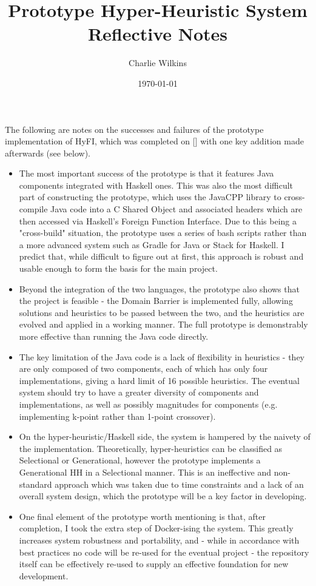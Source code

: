 \documentclass[11pt]{article}
\title{Prototype Hyper-Heuristic System Reflective Notes}
\author{Charlie Wilkins}
\date{\today}
\begin{document}
	\maketitle
	
	The following are notes on the successes and failures of the prototype implementation of HyFI, which was completed on [] with one key addition made afterwards (see below).

	\begin{itemize}
		\item The most important success of the prototype is that it features Java components integrated with Haskell ones. This was also the most difficult part of constructing the prototype, which uses the JavaCPP library to cross-compile Java code into a C Shared Object and associated headers which are then accessed via Haskell's Foreign Function Interface. Due to this being a "cross-build" situation, the prototype uses a series of bash scripts rather than a more advanced system such as Gradle for Java or Stack for Haskell. I predict that, while difficult to figure out at first, this approach is robust and usable enough to form the basis for the main project.
		\item Beyond the integration of the two languages, the prototype also shows that the project is feasible - the Domain Barrier is implemented fully, allowing solutions and heuristics to be passed between the two, and the heuristics are evolved and applied in a working manner. The full prototype is demonstrably more effective than running the Java code directly.
		\item The key limitation of the Java code is a lack of flexibility in heuristics - they are only composed of two components, each of which has only four implementations, giving a hard limit of 16 possible heuristics. The eventual system should try to have a greater diversity of components and implementations, as well as possibly magnitudes for components (e.g. implementing k-point rather than 1-point crossover).
		\item On the hyper-heuristic/Haskell side, the system is hampered by the naivety of the implementation. Theoretically, hyper-heuristics can be classified as Selectional or Generational, however the prototype implements a Generational HH in a Selectional manner. This is an ineffective and non-standard approach which was taken due to time constraints and a lack of an overall system design, which the prototype will be a key factor in developing.
		\item One final element of the prototype worth mentioning is that, after completion, I took the extra step of Docker-ising the system. This greatly increases system robustness and portability, and - while in accordance with best practices no code will be re-used for the eventual project - the repository itself can be effectively re-used to supply an effective foundation for new development. 
	\end{itemize}
\end{document}
